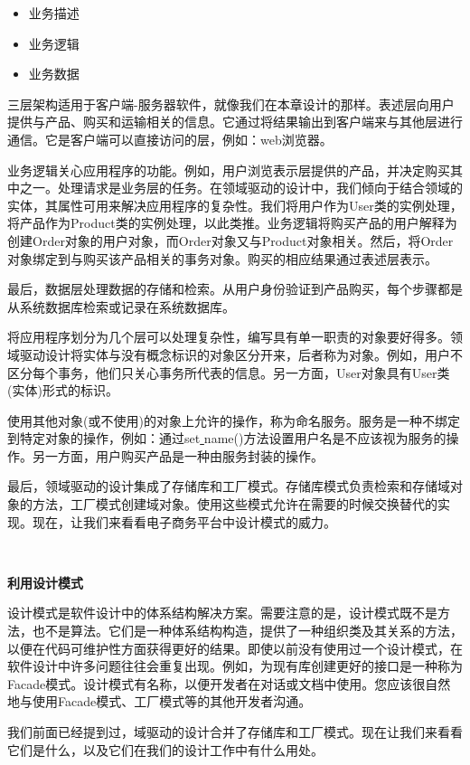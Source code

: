 \begin{itemize}
	\item 业务描述
	\item 业务逻辑
	\item 业务数据
\end{itemize}

三层架构适用于客户端-服务器软件，就像我们在本章设计的那样。表述层向用户提供与产品、购买和运输相关的信息。它通过将结果输出到客户端来与其他层进行通信。它是客户端可以直接访问的层，例如：web浏览器。 \par
业务逻辑关心应用程序的功能。例如，用户浏览表示层提供的产品，并决定购买其中之一。处理请求是业务层的任务。在领域驱动的设计中，我们倾向于结合领域的实体，其属性可用来解决应用程序的复杂性。我们将用户作为User类的实例处理，将产品作为Product类的实例处理，以此类推。业务逻辑将购买产品的用户解释为创建Order对象的用户对象，而Order对象又与Product对象相关。然后，将Order对象绑定到与购买该产品相关的事务对象。购买的相应结果通过表述层表示。 \par
最后，数据层处理数据的存储和检索。从用户身份验证到产品购买，每个步骤都是从系统数据库检索或记录在系统数据库。 \par
将应用程序划分为几个层可以处理复杂性，编写具有单一职责的对象要好得多。领域驱动设计将实体与没有概念标识的对象区分开来，后者称为对象。例如，用户不区分每个事务，他们只关心事务所代表的信息。另一方面，User对象具有User类(实体)形式的标识。 \par
使用其他对象(或不使用)的对象上允许的操作，称为命名服务。服务是一种不绑定到特定对象的操作，例如：通过set\underline{ }name()方法设置用户名是不应该视为服务的操作。另一方面，用户购买产品是一种由服务封装的操作。 \par
最后，领域驱动的设计集成了存储库和工厂模式。存储库模式负责检索和存储域对象的方法，工厂模式创建域对象。使用这些模式允许在需要的时候交换替代的实现。现在，让我们来看看电子商务平台中设计模式的威力。 \par

\noindent\textbf{}\ \par
\textbf{利用设计模式} \ \par
设计模式是软件设计中的体系结构解决方案。需要注意的是，设计模式既不是方法，也不是算法。它们是一种体系结构构造，提供了一种组织类及其关系的方法，以便在代码可维护性方面获得更好的结果。即使以前没有使用过一个设计模式，在软件设计中许多问题往往会重复出现。例如，为现有库创建更好的接口是一种称为Facade模式。设计模式有名称，以便开发者在对话或文档中使用。您应该很自然地与使用Facade模式、工厂模式等的其他开发者沟通。 \par
我们前面已经提到过，域驱动的设计合并了存储库和工厂模式。现在让我们来看看它们是什么，以及它们在我们的设计工作中有什么用处。 \par

